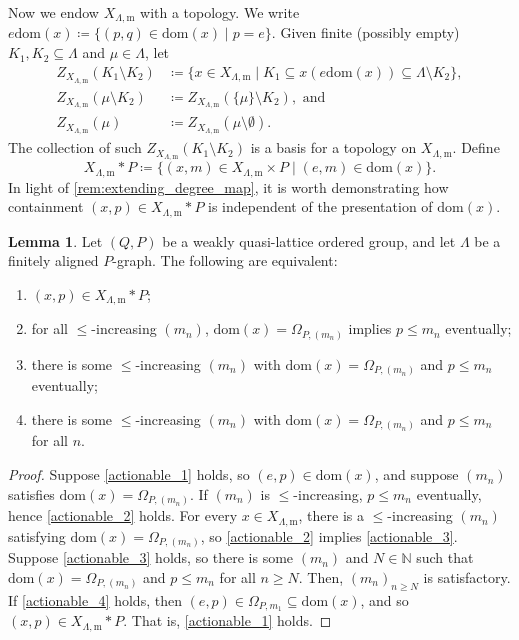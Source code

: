 \documentclass[11pt]{amsart}
\theoremstyle{definition}
\numberwithin{thm}{section}
\numberwithin{equation}{section}
\newtheorem{lemma}[thm]{Lemma}
\newcommand{\setof}[2]{\{ #1 \mid #2 \}}
\newcommand{\N}{\mathbb{N}}
\newcommand{\morphdom}[1]{\mathrm{dom}(#1)}
\newcommand{\M}{\mathrm{m}}
\newcommand{\PS}[2]{X_{#2, #1}}
\newcommand{\Fell}[3]{Z_{#1}\left(#2 \setminus #3\right)}
\newcommand{\Fellin}[2]{Z_{#1}\left(#2\right)}
\begin{document}
Now we endow $\PS{\M}{\Lambda}$ with a topology. 
We write $e\morphdom{x} \coloneqq \setof{(p, q) \in \morphdom{x}}{p = e}$.
Given finite (possibly empty) $K_1, K_2 \subseteq \Lambda$ and $\mu \in \Lambda$, let
\begin{align*}
\Fell{\PS{\M}{\Lambda}}{K_1}{K_2}
&\coloneqq \setof{
x \in \PS{\M}{\Lambda}
}{
K_1 \subseteq x(e\morphdom{x}) \subseteq \Lambda \setminus K_2
}, \\
\Fell{\PS{\M}{\Lambda}}{\mu}{K_2}
&\coloneqq \Fell{\PS{\M}{\Lambda}}{\{\mu\}}{K_2}, \text{ and } \\
\Fellin{\PS{\M}{\Lambda}}{\mu}
&\coloneqq \Fell{\PS{\M}{\Lambda}}{\mu}{\emptyset}.
\end{align*}
The collection of such $\Fell{\PS{\M}{\Lambda}}{K_1}{K_2}$ is a basis for a topology on $\PS{\M}{\Lambda}$.
\label{basis_for_PSmorph}
Define
\[
\PS{\M}{\Lambda} * P \coloneqq 
\setof{
(x, m) \in \PS{\M}{\Lambda} \times P
}{
(e, m) \in \morphdom{x}
}.
\]
In light of \cref{rem:extending_degree_map}, it is worth demonstrating how 
containment $(x, p) \in \PS{\M}{\Lambda} * P$ is independent of the presentation of $\morphdom{x}$.

\begin{lemma}
\label{lem:actionable_morphisms}
Let $(Q, P)$ be a weakly quasi-lattice ordered group, and let $\Lambda$ be a finitely aligned $P$-graph. 
The following are equivalent:
\begin{enumerate}
\item \label{actionable_1} $(x, p) \in \PS{\M}{\Lambda} * P$;
\item \label{actionable_2} for all $\leq$-increasing $(m_n)$, $\morphdom{x} = \Omega_{P, (m_n)}$ implies $p \leq m_n$ eventually;
\item \label{actionable_3} there is some $\leq$-increasing $(m_n)$ with $\morphdom{x} = \Omega_{P, (m_n)}$ and $p \leq m_n$ eventually;
\item \label{actionable_4} there is some $\leq$-increasing $(m_n)$ with $\morphdom{x} = \Omega_{P, (m_n)}$ and $p \leq m_n$ for all $n$.
\end{enumerate}
\end{lemma}
\begin{proof}
Suppose \eqref{actionable_1} holds, so $(e, p) \in \morphdom{x}$, and suppose $(m_n)$ satisfies $\morphdom{x} = \Omega_{P, (m_n)}$.
If $(m_n)$ is $\leq$-increasing, $p \leq m_n$ eventually, hence \eqref{actionable_2} holds. 
For every $x \in \PS{\M}{\Lambda}$, there is a $\leq$-increasing $(m_n)$ satisfying $\morphdom{x} = \Omega_{P, (m_n)}$, so \eqref{actionable_2} implies \eqref{actionable_3}. 
Suppose \eqref{actionable_3} holds, so there is some $(m_n)$ and $N \in \N$ such that $\morphdom{x} = \Omega_{P, (m_n)}$ and $p \leq m_n$ for all $n \geq N$.
Then, $(m_n)_{n \geq N}$ is satisfactory.
If \eqref{actionable_4} holds, then $(e, p) \in \Omega_{P, m_1} \subseteq \morphdom{x}$, and so $(x, p) \in \PS{\M}{\Lambda} * P$. 
That is, \eqref{actionable_1} holds.
\end{proof}
\end{document}
